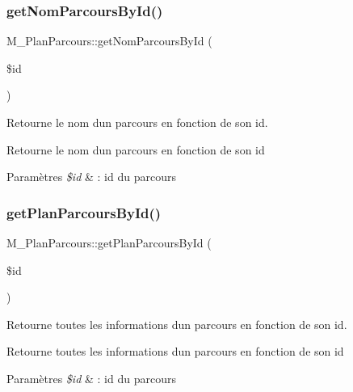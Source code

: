 \subsubsection{\texorpdfstring{get\+Nom\+Parcours\+By\+Id()}{getNomParcoursById()}}
{\footnotesize\ttfamily M\+\_\+\+Plan\+Parcours\+::get\+Nom\+Parcours\+By\+Id (\begin{DoxyParamCaption}\item[{}]{\$id }\end{DoxyParamCaption})}



Retourne le nom d\textquotesingle{}un parcours en fonction de son id. 

Retourne le nom d\textquotesingle{}un parcours en fonction de son id 
\begin{DoxyParams}{Paramètres}
{\em \$id} & \+: id du parcours \\
\hline
\end{DoxyParams}
\mbox{\label{class_m___plan_parcours_a2698ceacf730b3f9d1684bbec1b29778}} 
\subsubsection{\texorpdfstring{get\+Plan\+Parcours\+By\+Id()}{getPlanParcoursById()}}
{\footnotesize\ttfamily M\+\_\+\+Plan\+Parcours\+::get\+Plan\+Parcours\+By\+Id (\begin{DoxyParamCaption}\item[{}]{\$id }\end{DoxyParamCaption})}



Retourne toutes les informations d\textquotesingle{}un parcours en fonction de son id. 

Retourne toutes les informations d\textquotesingle{}un parcours en fonction de son id 
\begin{DoxyParams}{Paramètres}
{\em \$id} & \+: id du parcours \\
\hline
\end{DoxyParams}
\mbox{\label{class_m___plan_parcours_a7c5ab11a644a7ab9971250e348630331}} 
